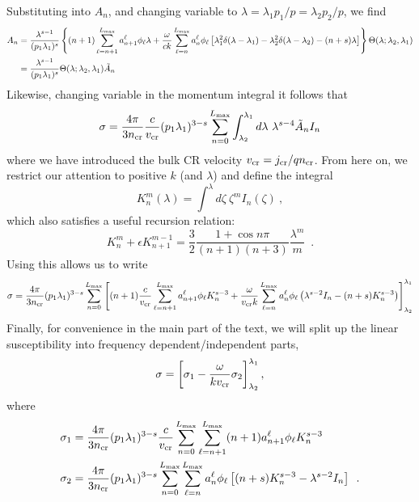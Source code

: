 \documentclass[a4paper,fleqn,usenatbib]{mnras}
\newcommand{\eqnb}{\begin{equation*}}
\newcommand{\eqne}{\end{equation*}}
\begin{document}
Substituting into $A_n$, and changing variable to $\lambda = \lambda_1 p_1/p =  \lambda_2 p_2/p$, we find
\begin{align*}
A_n & = \frac{ \lambda^{s-1} }{(p_1 \lambda_1)^s}  \left\lbrace
 (n+1) \sum_{\ell=n+1}^{{L_{\rm max}}}  a^\ell_{n+1} {\phi_\ell}\lambda+
\frac{\omega}{ck}\sum_{\ell=n}^{{L_{\rm max}}}  a^\ell_{n}\phi_\ell
\left[
\lambda_1^2\delta(\lambda-\lambda_1) - \lambda_2^2\delta(\lambda-\lambda_2)
-(n+s)   \lambda  
\right]
\right\rbrace \Theta(\lambda;\lambda_2,\lambda_1) \\
&= \frac{ \lambda^{s-1} }{(p_1 \lambda_1)^s}   \Theta(\lambda;\lambda_2,\lambda_1) \tilde{A}_n
\end{align*}
Likewise, changing variable in the momentum integral it follows that
\eqnb
\sigma =\frac{  4 \pi}{3n_{\rm cr}}  \frac{c}{v_{\rm cr}} (p_1 \lambda_1)^{3-s} 
\sum_{n=0}^{L_{\rm max}} \int_{\lambda_2} ^{\lambda_1} d\lambda~ \lambda^{s-4}  \tilde{A}_n I_n 
\eqne
where we have introduced the bulk CR velocity $v_{\rm cr}= j_{\rm cr}/ q n_{\rm cr}$.
From here on, we restrict our attention to positive $k$ (and $\lambda$) and define the integral
\eqnb
\label{Kint}
K_n^m(\lambda) = \int^\lambda d\zeta ~ \zeta^m I_n(\zeta) ~,
\eqne
which also satisfies a useful recursion relation:
\begin{equation}
\label{Kident}
K_n^{m} + \epsilon K_{n+1}^{m-1}= \frac{3}{2}\frac{1+\cos n\pi}{(n+1)(n+3)}\frac{\lambda^{m}}{m} \enspace .
\end{equation}
Using this allows us to write
\eqnb
\sigma =\frac{  4 \pi}{3n_{\rm cr}}  (p_1 \lambda_1)^{3-s} 
\sum_{n=0}^{L_{\rm max}} 
\left[
 (n+1) \frac{c}{v_{\rm cr}} \sum_{\ell=n+1}^{{L_{\rm max}}}  a^\ell_{n+1} {\phi_\ell}K_n^{s-3}+
\frac{\omega}{v_{\rm cr} k}\sum_{\ell=n}^{{L_{\rm max}}}  a^\ell_{n}\phi_\ell
\left(
\lambda^{s-2} I_n
-(n+s)  K_n^{s-3}
\right)
\right]_{\lambda_2} ^{\lambda_1} 
\eqne
Finally, for convenience in the main part of the text, we will split up the linear susceptibility into frequency dependent/independent parts, 
\begin{equation}
\label{Eq:SigmaFinal}
\sigma =\left[ \sigma_1 -  \frac{\omega}{kv_{\rm cr}} \sigma_2\right]_{\lambda_2} ^{\lambda_1} ,
\end{equation}
where   
\begin{align*}
&\sigma_1 =\frac{  4 \pi}{3n_{\rm cr}}  (p_1 \lambda_1)^{3-s} \frac{c}{v_{\rm cr}} 
\sum_{n=0}^{L_{\rm max}} 
 \sum_{\ell=n+1}^{{L_{\rm max}}}   (n+1)  a^\ell_{n+1} {\phi_\ell}K_n^{s-3}\\
&\sigma_2 =\frac{  4 \pi}{3n_{\rm cr}}  (p_1 \lambda_1)^{3-s} 
\sum_{n=0}^{L_{\rm max}} 
\sum_{\ell=n}^{{L_{\rm max}}}  a^\ell_{n}\phi_\ell
\left[
(n+s)  K_n^{s-3}-\lambda^{s-2} I_n 
\right]\enspace .
\end{align*}
\end{document}
